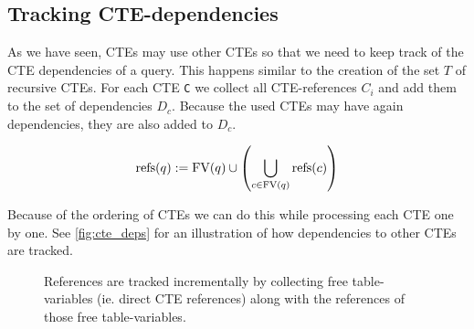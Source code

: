 
\subsection{Tracking CTE-dependencies}\label{tracking_cte_dependencies}
As we have seen, CTEs may use other CTEs so that we need to keep track of the CTE dependencies of a query. This happens similar to the creation of the set $T$ of recursive CTEs. For each CTE \texttt{C} we collect all CTE-references \texttt{$C_i$} and add them to the set of dependencies $D_c$. Because the used CTEs may have again dependencies, they are also added to $D_c$.

$$\operatorname{\text{refs}}(q) := \operatorname{\text{\rm FV}}(q) \cup \left(\bigcup_{c \in \operatorname{\text{\rm FV}}(q)} \operatorname{\text{refs}}(c)\right)$$

Because of the ordering of CTEs we can do this while processing each CTE one by one. See \autoref{fig:cte_deps} for an illustration of how dependencies to other CTEs are tracked.

\begin{figure}[h!]
    \centering
    \caption{References are tracked incrementally by collecting free table-variables (ie. direct CTE references) along with the references of those free table-variables.}
    \label{fig:cte_deps}
\end{figure}

